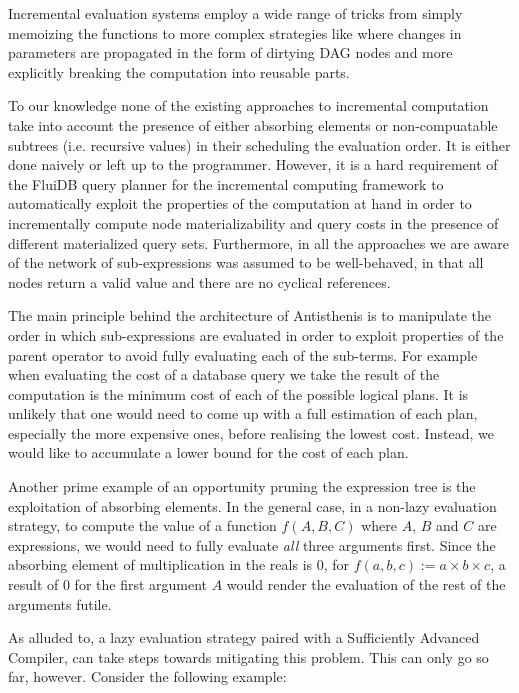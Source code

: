 Incremental evaluation systems employ a wide range of tricks from
simply memoizing the functions
\cite{pughIncrementalComputationFunction1989} to more complex
strategies like \cite{hammerAdaptonComposableDemanddriven2014a} where
changes in parameters are propagated in the form of dirtying DAG nodes
and more explicitly breaking the computation into reusable parts.

To our knowledge none of the existing approaches to incremental
computation take into account the presence of either absorbing
elements or non-compuatable subtrees (i.e. recursive values) in their
scheduling the evaluation order. It is either done naively or left up
to the programmer. However, it is a hard requirement of the FluiDB
query planner for the incremental computing framework to automatically
exploit the properties of the computation at hand in order to
incrementally compute node materializability and query costs in the
presence of different materialized query sets. Furthermore, in all the
approaches we are aware of the network of sub-expressions was assumed
to be well-behaved, in that all nodes return a valid value and there
are no cyclical references.

The main principle behind the architecture of Antisthenis is to
manipulate the order in which sub-expressions are evaluated in order
to exploit properties of the parent operator to avoid fully evaluating
each of the sub-terms. For example when evaluating the cost of a
database query we take the result of the computation is the minimum
cost of each of the possible logical plans. It is unlikely that one
would need to come up with a full estimation of each plan, especially
the more expensive ones, before realising the lowest cost. Instead, we
would like to accumulate a lower bound for the cost of each plan.

Another prime example of an opportunity pruning the expression tree is
the exploitation of absorbing elements. In the general case, in a
non-lazy evaluation strategy, to compute the value of a function
\(f(A,B,C)\) where \(A\), \(B\) and \(C\) are expressions, we would
need to fully evaluate \emph{all} three arguments first. Since the
absorbing element of multiplication in the reals is 0, for
\(f(a,b,c) := a \times b \times c\), a result of 0 for the first
argument \(A\) would render the evaluation of the rest of the
arguments futile.

As alluded to, a lazy evaluation strategy paired with a Sufficiently
Advanced Compiler, can take steps towards mitigating this
problem. This can only go so far, however. Consider the following
example:

